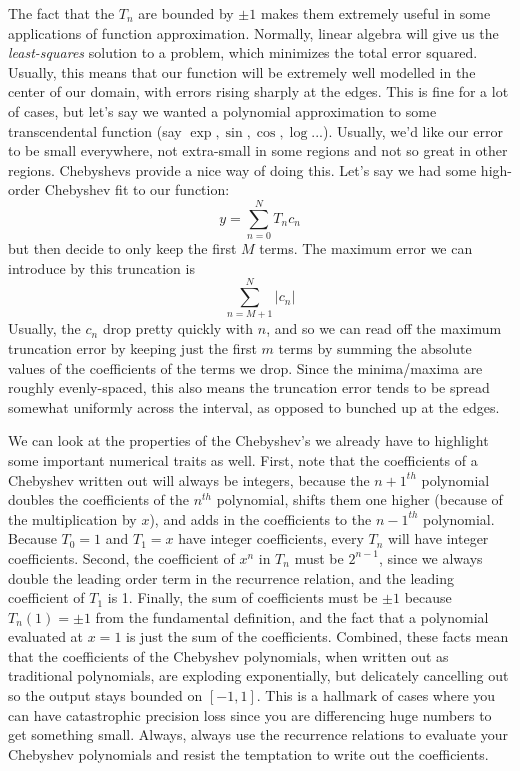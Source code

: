\documentclass[12]{article}
\begin{document}
The fact that the $T_n$ are bounded by $\pm 1$ makes them extremely
useful in some applications of function approximation.  Normally,
linear algebra will give us the {\textit{least-squares}} solution to a
problem, which minimizes the total error squared.  Usually, this means
that our function will be extremely well modelled in the center of our
domain, with errors rising sharply at the edges.  This is fine for a
lot of cases, but let's say we wanted a polynomial approximation to
some transcendental function (say $\exp, \sin, \cos, \log$...).
Usually, we'd like our error to be small everywhere, not extra-small
in some regions and not so great in other regions.  Chebyshevs provide
a nice way of doing this.  Let's say we had some high-order Chebyshev
fit to our function:
$$y=\sum_{n=0}^{N} T_n c_n$$
but then decide to only keep the first $M$ terms.  The maximum error
we can introduce by this truncation is 
$$\sum_{n=M+1}^N |c_n|$$
Usually, the $c_n$ drop pretty quickly with $n$, and so we can read
off the maximum truncation error by keeping just the first $m$ terms
by summing the absolute values of the coefficients of the terms we
drop.  Since the minima/maxima are roughly evenly-spaced, this also
means the truncation error tends to be spread somewhat uniformly
across the interval, as opposed to bunched up at the edges.  

We can look at the properties of the Chebyshev's we already have to
highlight some important numerical traits as well.  First, note that
the coefficients of a Chebyshev written out will always be integers,
because the $n+1^{th}$ polynomial doubles the coefficients of the
$n^{th}$ polynomial, shifts them one higher (because of the
multiplication by $x$), and adds in the coefficients to the $n-1^{th}$
polynomial.  Because $T_0=1$ and $T_1=x$ have integer coefficients,
every $T_n$ will have integer coefficients.  Second, the coefficient
of $x^n$ in $T_n$ must be $2^{n-1}$, since we always double the leading
order term in the recurrence relation, and the leading coefficient of
$T_1$ is 1.  Finally, the sum of coefficients must be $\pm 1$ because
$T_n(1)=\pm 1$ from the fundamental definition, and the fact that a
polynomial evaluated at $x=1$ is just the sum of the coefficients.
Combined, these facts mean that the coefficients of the Chebyshev
polynomials, when written out as traditional polynomials, are
exploding exponentially, but delicately cancelling out so the output
stays bounded on $[-1,1]$.  This is a hallmark of cases where you can
have catastrophic precision loss since you are differencing huge
numbers to get something small.  Always, always use the recurrence
relations to evaluate your Chebyshev polynomials and resist the
temptation to write out the coefficients.
\end{document}
